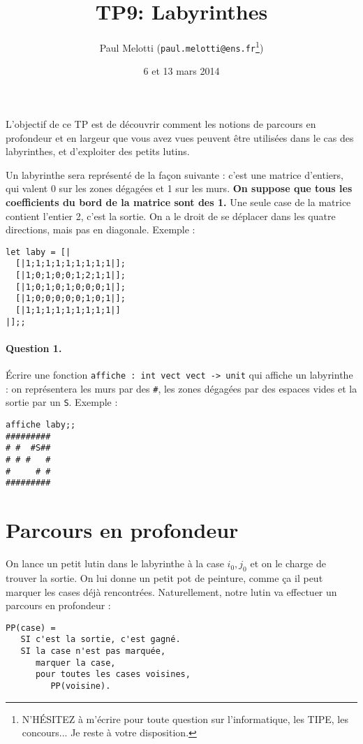 \documentclass[10pt,a4paper]{article}
\begin{document}
\title{TP9: Labyrinthes}
\author{Paul Melotti (\texttt{paul.melotti@ens.fr}\footnote{N'HÉSITEZ à
m'écrire pour toute question sur l'informatique, les TIPE, les concours... Je
reste à votre disposition.})}
\date{6 et 13 mars 2014}
\maketitle{}

L'objectif de ce TP est de découvrir comment les notions de parcours en
profondeur et en largeur que vous avez vues peuvent être utilisées dans le cas
des labyrinthes, et d'exploiter des petits lutins.

Un labyrinthe sera représenté de la façon suivante : c'est une matrice d'entiers,
qui valent 0 sur les zones dégagées et 1 sur les murs. \textbf{On suppose que tous
les coefficients du bord de la matrice sont des 1.} Une seule case de la matrice
contient l'entier 2, c'est la sortie. On a le droit de se déplacer dans les quatre
directions, mais pas en diagonale. Exemple :
\begin{verbatim}let laby = [|
  [|1;1;1;1;1;1;1;1;1|];
  [|1;0;1;0;0;1;2;1;1|];
  [|1;0;1;0;1;0;0;0;1|];
  [|1;0;0;0;0;0;1;0;1|];
  [|1;1;1;1;1;1;1;1;1|]
|];;\end{verbatim}
 
\paragraph{Question 1.} Écrire une fonction \texttt{affiche : int vect vect -> unit}
qui affiche un labyrinthe : on représentera les murs par des \texttt{\#}, les
zones dégagées par des espaces vides et la sortie par un \texttt{S}. Exemple :
\begin{verbatim}affiche laby;;
#########
# #  #S##
# # #   #
#     # #
#########\end{verbatim}

\section{Parcours en profondeur}
On lance un petit lutin dans le labyrinthe à la case $i_0,j_0$ et on le charge
de trouver la sortie. On lui donne un petit pot de peinture, comme ça il peut
marquer les cases déjà rencontrées. Naturellement, notre lutin va effectuer un
parcours en profondeur :
\begin{verbatim}PP(case) =
   SI c'est la sortie, c'est gagné.
   SI la case n'est pas marquée,
      marquer la case,
      pour toutes les cases voisines,
         PP(voisine).
\end{verbatim}
\end{document}
